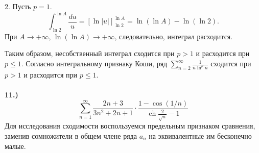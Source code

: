 \documentclass[a4paper, 12pt]{report}
\numberwithin{equation}{section}
\begin{document}
	2. Пусть $p = 1$.
	$$ \int_{\ln 2}^{\ln A} \frac{du}{u} = [\ln|u|]_{\ln 2}^{\ln A} = \ln(\ln A) - \ln(\ln 2). $$
	При $A \to +\infty$, $\ln(\ln A) \to +\infty$, следовательно, интеграл расходится.
	
	Таким образом, несобственный интеграл сходится при $p > 1$ и расходится при $p \le 1$.
	Согласно интегральному признаку Коши, ряд $\sum_{n=2}^{\infty} \frac{1}{n \ln^p n}$ сходится при $p > 1$ и расходится при $p \le 1$.
	\\\\
	\textbf{11.)}
	$$\sum_{n=1}^{\infty} \frac{2n+3}{3n^2+2n+1} \cdot \frac{1-\cos(1/n)}{\operatorname{ch}\frac{2}{\sqrt{n}}-1}$$
	Для исследования сходимости воспользуемся предельным признаком сравнения, заменив сомножители в общем члене ряда $a_n$ на эквивалентные им бесконечно малые.
	
\end{document}
